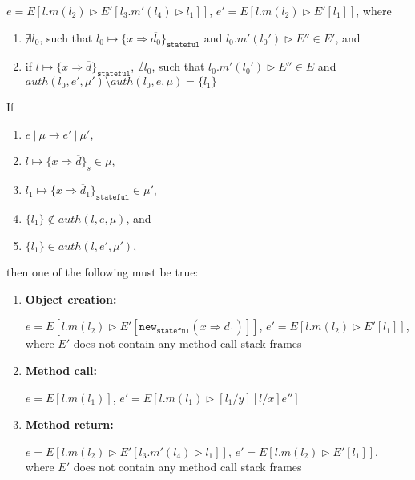 \documentclass{llncs}
\newcommand{\keywadj}[1]{\mathtt{#1}}
\begin{document}
\begin{theorem}
\begin{itemize}
$e = E[l.m(l_2) \rhd E'[l_3.m'(l_4) \rhd l_1]]$, $e' = E[l.m(l_2) \rhd E'[l_1]]$, where
\begin{enumerate}
\item $\nexists l_0$, such that $l_0 \mapsto \{ x \Rightarrow \overline{d_0}\}_{\keywadj{stateful}}$ and $l_0.m'(l_0') \rhd E'' \in E'$, and
\item if $l \mapsto \{ x \Rightarrow \overline{d}\}_{\keywadj{stateful}}$, $\nexists l_0$, such that $l_0.m'(l_0') \rhd E'' \in E$ and $auth(l_0, e', \mu') \setminus auth(l_0, e, \mu) = \{ l_1 \}$
\end{enumerate}
\end{itemize}

\end{theorem}


\begin{theorem} If
\begin{enumerate}
\item $e~|~\mu \longrightarrow e'~|~\mu'$,
\item $l \mapsto \{ x \Rightarrow \overline{d} \}_s \in \mu$,
\item $l_1 \mapsto \{ x \Rightarrow \overline{d}_1 \}_{\keywadj{stateful}} \in \mu'$,
\item $\{ l_1 \} \not\in auth(l, e, \mu)$, and
\item $\{ l_1 \} \in auth(l, e', \mu')$,
\end{enumerate}
then one of the following must be true:
\begin{enumerate}
\item \textbf{Object creation:}

$e = E[l.m(l_2) \rhd E'[\keywadj{new}_{\keywadj{stateful}}(x \Rightarrow \overline{d}_1)]]$, $e' = E[l.m(l_2) \rhd E'[l_1]]$, where $E'$ does not contain any method call stack frames

\item \textbf{Method call:}

$e = E[l.m(l_1)]$, $e' = E[l.m(l_1) \rhd [l_1/y][l/x]e'']$

\item \textbf{Method return:}

$e = E[l.m(l_2) \rhd E'[l_3.m'(l_4) \rhd l_1]]$, $e' = E[l.m(l_2) \rhd E'[l_1]]$, where $E'$ does not contain any method call stack frames
\end{enumerate}

\end{theorem}
\end{document}

